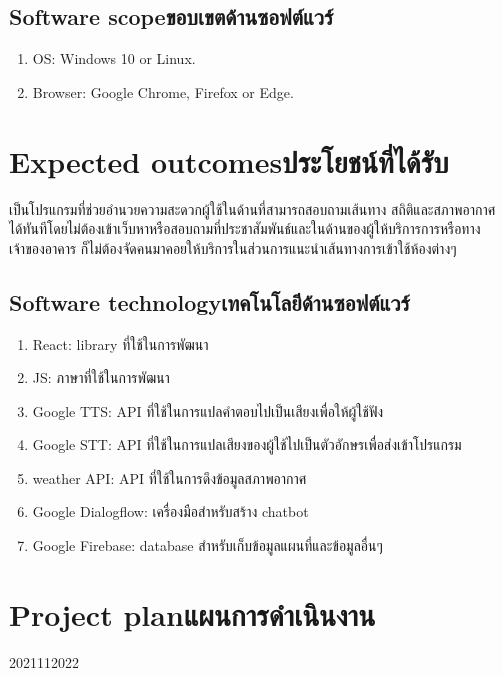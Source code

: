 \subsection{\ifenglish Software scope\else ขอบเขตด้านซอฟต์แวร์\fi}
\begin{enumerate}
    \item OS: Windows 10 or Linux.
    \item Browser: Google Chrome, Firefox or Edge.
\end{enumerate}

\section{\ifenglish Expected outcomes\else ประโยชน์ที่ได้รับ\fi}
เป็นโปรแกรมที่ช่วยอำนวยความสะดวกผู้ใช้ในด้านที่สามารถสอบถามเส้นทาง สถิติและสภาพอากาศ 
ได้ทันทีโดยไม่ต้องเข้าเว็บหาหรือสอบถามที่ประชาสัมพันธ์และในด้านของผู้ให้บริการการหรือทางเจ้าของอาคาร
ก็ไม่ต้องจัดคนมาคอยให้บริการในส่วนการแนะนำเส้นทางการเข้าใช้ห้องต่างๆ 

\subsection{\ifenglish Software technology\else เทคโนโลยีด้านซอฟต์แวร์\fi}
\begin{enumerate}
    \item React: library ที่ใช้ในการพัฒนา
    \item JS: ภาษาที่ใช้ในการพัฒนา
    \item Google TTS: API ที่ใช้ในการแปลคำตอบไปเป็นเสียงเพื่อให้ผู้ใช้ฟัง
    \item Google STT: API ที่ใช้ในการแปลเสียงของผู้ใช้ไปเป็นตัวอักษรเพื่อส่งเข้าโปรแกรม
    \item weather API: API ที่ใช้ในการดึงข้อมูลสภาพอากาศ
    \item Google Dialogflow: เครื่องมือสำหรับสร้าง chatbot
    \item Google Firebase: database สำหรับเก็บข้อมูลแผนที่และข้อมูลอื่นๆ
\end{enumerate}

\section{\ifenglish Project plan\else แผนการดำเนินงาน\fi}

\begin{plan}{11}{2021}{11}{2022}
\end{plan}

